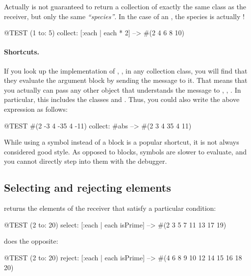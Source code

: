 \documentclass[a4paper,10pt,twoside]{book}
\begin{document}
Actually  is not guaranteed to return a collection of exactly the same class as the receiver, but only the same \emph{``species''}.
In the case of an , the species is actually !
\begin{code}{@TEST}
(1 to: 5) collect: [:each | each * 2] --> #(2 4 6 8 10)
\end{code}

\paragraph{Shortcuts.}

If you look up the implementation of , , \autc in any collection class, you will find that they evaluate the argument block by sending the message  to it.
That means that you actually can pass any other object that understands the message  to , , \etc*.
In particular, this includes the classes  and .
Thus, you could also write the above expression as follows:
\begin{code}{@TEST}
#(2 -3 4 -35 4 -11) collect: #abs --> #(2 3 4 35 4 11)
\end{code}
\noindent
While using a  symbol instead of a block is a popular shortcut, it is not always considered good style.
As opposed to blocks, symbols are slower to evaluate, and you cannot directly step into them with the debugger.

\subsection{Selecting and rejecting elements}

 returns the elements of the receiver that satisfy a particular condition:

\begin{code}{@TEST}
(2 to: 20) select: [:each | each isPrime] --> #(2 3 5 7 11 13 17 19)
\end{code}

 does the opposite:
\begin{code}{@TEST}
(2 to: 20) reject: [:each | each isPrime] --> #(4 6 8 9 10 12 14 15 16 18 20)
\end{code}
\end{document}
